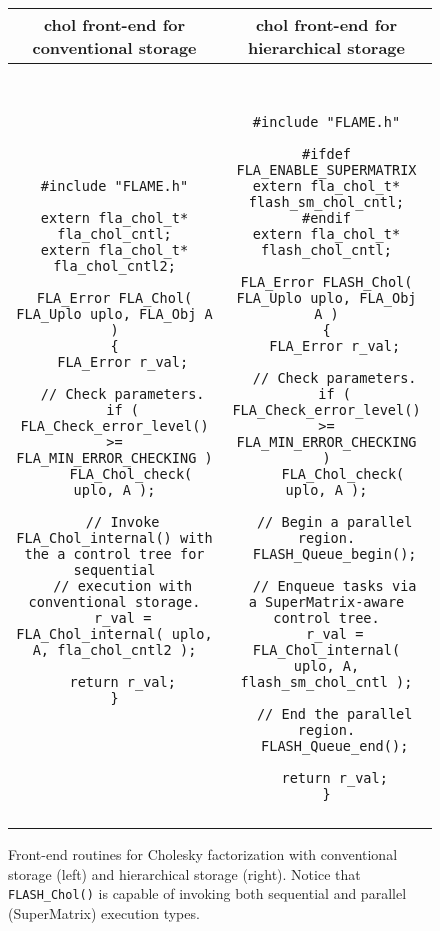 \begin{figure}[t]
\begin{center}
\begin{tabular}{|c|c|}
\hline
{\sc chol} front-end for conventional storage & {\sc chol} front-end for hierarchical storage \\ \hline
\begin{minipage}[t]{3in}
{\tiny
\begin{verbatim}
#include "FLAME.h"

extern fla_chol_t* fla_chol_cntl;
extern fla_chol_t* fla_chol_cntl2;

FLA_Error FLA_Chol( FLA_Uplo uplo, FLA_Obj A )
{
  FLA_Error r_val;

  // Check parameters.
  if ( FLA_Check_error_level() >= FLA_MIN_ERROR_CHECKING )
    FLA_Chol_check( uplo, A );

  // Invoke FLA_Chol_internal() with the a control tree for sequential
  // execution with conventional storage.
  r_val = FLA_Chol_internal( uplo, A, fla_chol_cntl2 );

  return r_val;
}
\end{verbatim}
}
\end{minipage}
&
\begin{minipage}[t]{3in}
{\tt \tiny
\begin{verbatim}
#include "FLAME.h"

#ifdef FLA_ENABLE_SUPERMATRIX
extern fla_chol_t* flash_sm_chol_cntl;
#endif
extern fla_chol_t* flash_chol_cntl;

FLA_Error FLASH_Chol( FLA_Uplo uplo, FLA_Obj A )
{
  FLA_Error r_val;

  // Check parameters.
  if ( FLA_Check_error_level() >= FLA_MIN_ERROR_CHECKING )
    FLA_Chol_check( uplo, A );

  // Begin a parallel region.
  FLASH_Queue_begin();

  // Enqueue tasks via a SuperMatrix-aware control tree.
  r_val = FLA_Chol_internal( uplo, A, flash_sm_chol_cntl );

  // End the parallel region.
  FLASH_Queue_end();

  return r_val;
}
\end{verbatim}
}
\end{minipage}
\\
 & \\ \hline
\end{tabular}
\end{center}
\caption{
Front-end routines for Cholesky factorization with conventional storage (left)
and hierarchical storage (right).
Notice that {\tt FLASH\_Chol()} is capable of invoking both sequential and
parallel (SuperMatrix) execution types.
}
\label{fig:cntl-front-ends}
\end{figure}
